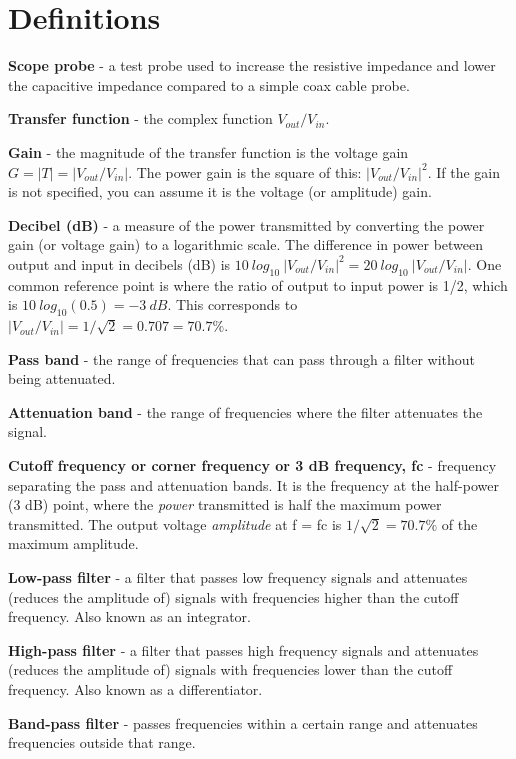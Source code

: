\documentclass[10pt]{PhysLab1C} %
\begin{document}

\section{Definitions}

\textbf{Scope probe} - a test probe used to increase the resistive
impedance and lower the capacitive impedance compared to a simple coax
cable probe.

\textbf{Transfer function} - the complex function \(V_{out}/V_{in}\).

\textbf{Gain} - the magnitude of the transfer function is the voltage
gain \(G=|T|=|V_{out}/V_{in}|\). The power gain is the square of this:
\(|V_{out}/V_{in}|^2\). If the gain is not specified, you can assume it
is the voltage (or amplitude) gain.

\textbf{Decibel (dB)} - a measure of the power transmitted by converting
the power gain (or voltage gain) to a logarithmic scale. The difference
in power between output and input in decibels (dB) is
\(10~log_{10}~|V_{out}/V_{in}|^2 =20~log_{10}~|V_{out}/V_{in}| \). One
common reference point is where the ratio of output to input power is
1/2, which is \(10~log_{10}(0.5) = -3~dB\). This corresponds to
\(|V_{out}/V_{in}| = 1/\sqrt 2 = 0.707 = 70.7\%\).

\textbf{Pass band} - the range of frequencies that can pass through a
filter without being attenuated.

\textbf{Attenuation band }- the range of frequencies where the filter
attenuates the signal.

\textbf{Cutoff frequency or corner frequency or 3 dB frequency, fc} -
frequency separating the pass and attenuation bands. It is the frequency
at the half-power (3 dB) point, where the \emph{power} transmitted is
half the maximum power transmitted. The output voltage \emph{amplitude}
at f = fc is $1/\sqrt{2} = 70.7\%$ of the maximum amplitude.

\textbf{Low-pass filter} - a filter that passes low frequency signals
and attenuates (reduces the amplitude of) signals with frequencies
higher than the cutoff frequency. Also known as an integrator.

\textbf{High-pass filter} - a filter that passes high frequency signals
and attenuates (reduces the amplitude of) signals with frequencies lower
than the cutoff frequency. Also known as a differentiator.

\textbf{Band-pass filter} - passes frequencies within a certain range
and attenuates frequencies outside that range.
\end{document}
